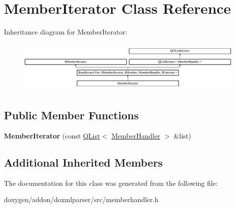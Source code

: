 \hypertarget{class_member_iterator}{}\section{Member\+Iterator Class Reference}
\label{class_member_iterator}
Inheritance diagram for Member\+Iterator\+:\begin{figure}[H]
\begin{center}
\leavevmode
\includegraphics[height=2.551253cm]{class_member_iterator}
\end{center}
\end{figure}
\subsection*{Public Member Functions}
\begin{DoxyCompactItemize}
\item 
\mbox{\label{class_member_iterator_aa0f5db3367045f3e745c8ffb4778a1cb}} 
{\bfseries Member\+Iterator} (const \mbox{\hyperlink{class_q_list}{Q\+List}}$<$ \mbox{\hyperlink{class_member_handler}{Member\+Handler}} $>$ \&list)
\end{DoxyCompactItemize}
\subsection*{Additional Inherited Members}


The documentation for this class was generated from the following file\+:\begin{DoxyCompactItemize}
\item 
doxygen/addon/doxmlparser/src/memberhandler.\+h\end{DoxyCompactItemize}
